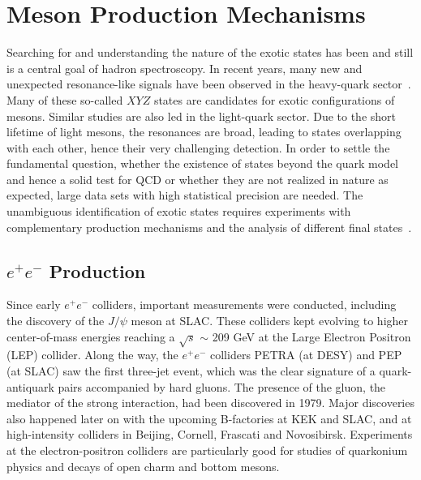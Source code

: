 \section{Meson Production Mechanisms}
\label{p.1.3}

Searching for and understanding the nature of the exotic states has been and still is a central goal of hadron spectroscopy. In recent years, many new and unexpected resonance-like signals have been observed in the heavy-quark sector~\cite{Tanabashi18}. Many of these so-called $XYZ$ states are candidates for exotic configurations of mesons. Similar studies are also led in the light-quark sector. Due to the short lifetime of light mesons, the resonances are broad, leading to states overlapping with each other, hence their very challenging detection. In order to settle the fundamental question, whether the existence of states beyond the quark model and hence a solid test for QCD or whether they are not realized in nature as expected, large data sets with high statistical precision are needed. The unambiguous identification of exotic states requires experiments with complementary production mechanisms and the analysis of different final states~\cite{Szczepaniak01}.
 
\subsection{$e^{+}e^{-}$ Production}

Since early $e^{+}e^{-}$ colliders, important measurements were conducted, including the discovery of the $J/\psi$ meson at SLAC. These colliders kept evolving to higher center-of-mass energies reaching a $\sqrt{s}$ $\sim$ 209 GeV at the Large Electron Positron (LEP) collider. Along the way, the $e^{+}e^{-}$ colliders PETRA (at DESY) and PEP (at SLAC) saw the first three-jet event, which was the clear signature of a quark-antiquark pairs accompanied by hard gluons. The presence of the gluon, the mediator of the strong interaction, had been discovered in 1979. Major discoveries also happened later on with the upcoming B-factories at KEK and SLAC, and at high-intensity colliders in Beijing, Cornell, Frascati and Novosibirsk. Experiments at the electron-positron colliders are particularly good for studies of quarkonium physics and decays of open charm and bottom mesons.

